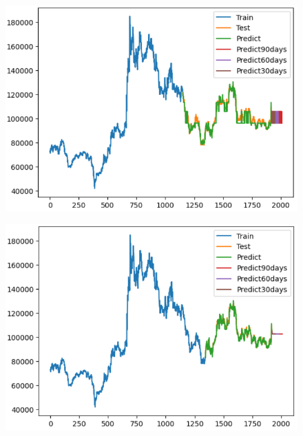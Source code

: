 \documentclass{article}
\begin{document}
\begin{multicols}{2}
\begin{figure}[H]
    \centering
    \begin{minipage}{0.15\textwidth}
    \centering
    \includegraphics[width=1\textwidth]{Image/XGBoost/XGBoost_LG_6_4.png}
   
    \label{fig:1}
    \end{minipage}%
    \begin{minipage}{0.15\textwidth}
    \centering
    \includegraphics[width=1\textwidth]{Image/XGBoost/XGBoost_LG_7_3.png}
  

\end{minipage}
\end{figure}
\end{multicols}
\end{document}
